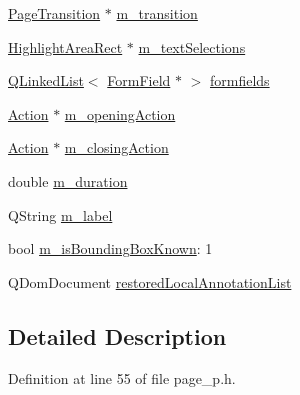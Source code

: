 \begin{DoxyCompactItemize}
\hyperlink{classOkular_1_1PageTransition}{Page\+Transition} $\ast$ \hyperlink{classOkular_1_1PagePrivate_aed53103e51c46cfa19d908ad17d4dc64}{m\+\_\+transition}
\item 
\hyperlink{classOkular_1_1HighlightAreaRect}{Highlight\+Area\+Rect} $\ast$ \hyperlink{classOkular_1_1PagePrivate_a98312e1819fa37a313852accd9bd47f8}{m\+\_\+text\+Selections}
\item 
\hyperlink{classQLinkedList}{Q\+Linked\+List}$<$ \hyperlink{classOkular_1_1FormField}{Form\+Field} $\ast$ $>$ \hyperlink{classOkular_1_1PagePrivate_a398106cf0b0b54b59dd2bbc625092151}{formfields}
\item 
\hyperlink{classOkular_1_1Action}{Action} $\ast$ \hyperlink{classOkular_1_1PagePrivate_a403a6221308ea39b4bac82be56f43711}{m\+\_\+opening\+Action}
\item 
\hyperlink{classOkular_1_1Action}{Action} $\ast$ \hyperlink{classOkular_1_1PagePrivate_a02392b2b37c1f72ff9d82d418b3da795}{m\+\_\+closing\+Action}
\item 
double \hyperlink{classOkular_1_1PagePrivate_a769dbcae7ef3ee39d0f3f39d0022c6e1}{m\+\_\+duration}
\item 
Q\+String \hyperlink{classOkular_1_1PagePrivate_adbe1a6d7fd7b290f9db98aac52b0f205}{m\+\_\+label}
\item 
bool \hyperlink{classOkular_1_1PagePrivate_a236fd24cf599e972f7c75867a49f5337}{m\+\_\+is\+Bounding\+Box\+Known}\+: 1
\item 
Q\+Dom\+Document \hyperlink{classOkular_1_1PagePrivate_ac81ba5bf127f946b7b810821081c9f42}{restored\+Local\+Annotation\+List}
\end{DoxyCompactItemize}


\subsection{Detailed Description}


Definition at line 55 of file page\+\_\+p.\+h.



